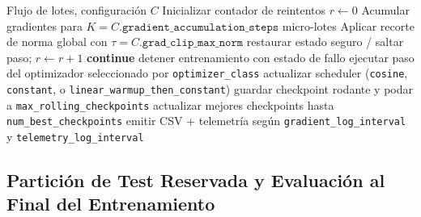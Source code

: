 \begin{algorithm}[t]
\caption{Paso de Entrenamiento Guiado por Esquema con Controles de Estabilidad}
\begin{algorithmic}[1]
\Require Flujo de lotes, configuración $C$
\State Inicializar contador de reintentos $r\gets 0$
    \State Acumular gradientes para $K=C.\texttt{gradient\_accumulation\_steps}$ micro-lotes
    \State Aplicar recorte de norma global con $\tau=C.\texttt{grad\_clip\_max\_norm}$
            \State restaurar estado seguro / saltar paso; $r \gets r+1$
            \State \textbf{continue}
        \Else
            \State detener entrenamiento con estado de fallo
        \EndIf
    \EndIf
    \State ejecutar paso del optimizador seleccionado por \texttt{optimizer\_class}
    \State actualizar scheduler (\texttt{cosine}, \texttt{constant}, o \texttt{linear\_warmup\_then\_constant})
        \State guardar checkpoint rodante y podar a \texttt{max\_rolling\_checkpoints}
    \EndIf
    \State actualizar mejores checkpoints hasta \texttt{num\_best\_checkpoints}
    \State emitir CSV + telemetría según \texttt{gradient\_log\_interval} y \texttt{telemetry\_log\_interval}
\EndFor
\end{algorithmic}
\end{algorithm}

\subsection{Partición de Test Reservada y Evaluación al Final del Entrenamiento}

